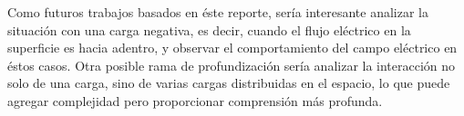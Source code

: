 \documentclass[12pt, letterpaper]{report}
\begin{document}
Como futuros trabajos basados en éste reporte, sería interesante analizar la situación con una carga negativa, es decir, cuando el flujo eléctrico en la superficie es hacia adentro, y observar el comportamiento del campo 
eléctrico en éstos casos. Otra posible rama de profundización sería analizar la interacción no solo de una carga, sino de 
varias cargas distribuidas en el espacio, lo que puede agregar complejidad pero proporcionar comprensión más profunda. 
\end{document}

